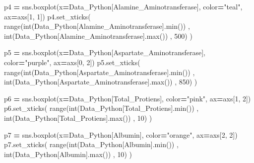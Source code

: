 \documentclass[
  11pt,
  a4paper,
]{article}
\newenvironment{Shaded}{\begin{snugshade}}{\end{snugshade}}
\newcommand{\BuiltInTok}[1]{#1}
\newcommand{\DecValTok}[1]{\textcolor[rgb]{0.00,0.00,0.81}{#1}}
\newcommand{\NormalTok}[1]{#1}
\newcommand{\OperatorTok}[1]{\textcolor[rgb]{0.81,0.36,0.00}{\textbf{#1}}}
\newcommand{\StringTok}[1]{\textcolor[rgb]{0.31,0.60,0.02}{#1}}
\begin{document}
\begin{Shaded}
\begin{Highlighting}[]
\NormalTok{p4 }\OperatorTok{=}\NormalTok{ sns.boxplot(x}\OperatorTok{=}\NormalTok{Data\_Python[}\StringTok{\textquotesingle{}Alamine\_Aminotransferase\textquotesingle{}}\NormalTok{], color}\OperatorTok{=}\StringTok{"teal"}\NormalTok{, ax}\OperatorTok{=}\NormalTok{axs[}\DecValTok{1}\NormalTok{, }\DecValTok{1}\NormalTok{])}
\NormalTok{p4.set\_xticks( }\BuiltInTok{range}\NormalTok{(}\BuiltInTok{int}\NormalTok{(Data\_Python[}\StringTok{\textquotesingle{}Alamine\_Aminotransferase\textquotesingle{}}\NormalTok{].}\BuiltInTok{min}\NormalTok{()) , }\BuiltInTok{int}\NormalTok{(Data\_Python[}\StringTok{\textquotesingle{}Alamine\_Aminotransferase\textquotesingle{}}\NormalTok{].}\BuiltInTok{max}\NormalTok{()) , }\DecValTok{500}\NormalTok{) )}

\NormalTok{p5 }\OperatorTok{=}\NormalTok{ sns.boxplot(x}\OperatorTok{=}\NormalTok{Data\_Python[}\StringTok{\textquotesingle{}Aspartate\_Aminotransferase\textquotesingle{}}\NormalTok{], color}\OperatorTok{=}\StringTok{"purple"}\NormalTok{, ax}\OperatorTok{=}\NormalTok{axs[}\DecValTok{0}\NormalTok{, }\DecValTok{2}\NormalTok{])}
\NormalTok{p5.set\_xticks( }\BuiltInTok{range}\NormalTok{(}\BuiltInTok{int}\NormalTok{(Data\_Python[}\StringTok{\textquotesingle{}Aspartate\_Aminotransferase\textquotesingle{}}\NormalTok{].}\BuiltInTok{min}\NormalTok{()) , }\BuiltInTok{int}\NormalTok{(Data\_Python[}\StringTok{\textquotesingle{}Aspartate\_Aminotransferase\textquotesingle{}}\NormalTok{].}\BuiltInTok{max}\NormalTok{()) , }\DecValTok{850}\NormalTok{) )}

\NormalTok{p6 }\OperatorTok{=}\NormalTok{ sns.boxplot(x}\OperatorTok{=}\NormalTok{Data\_Python[}\StringTok{\textquotesingle{}Total\_Protiens\textquotesingle{}}\NormalTok{], color}\OperatorTok{=}\StringTok{"pink"}\NormalTok{, ax}\OperatorTok{=}\NormalTok{axs[}\DecValTok{1}\NormalTok{, }\DecValTok{2}\NormalTok{])}
\NormalTok{p6.set\_xticks( }\BuiltInTok{range}\NormalTok{(}\BuiltInTok{int}\NormalTok{(Data\_Python[}\StringTok{\textquotesingle{}Total\_Protiens\textquotesingle{}}\NormalTok{].}\BuiltInTok{min}\NormalTok{()) , }\BuiltInTok{int}\NormalTok{(Data\_Python[}\StringTok{\textquotesingle{}Total\_Protiens\textquotesingle{}}\NormalTok{].}\BuiltInTok{max}\NormalTok{()) , }\DecValTok{10}\NormalTok{) )}

\NormalTok{p7 }\OperatorTok{=}\NormalTok{ sns.boxplot(x}\OperatorTok{=}\NormalTok{Data\_Python[}\StringTok{\textquotesingle{}Albumin\textquotesingle{}}\NormalTok{], color}\OperatorTok{=}\StringTok{"orange"}\NormalTok{, ax}\OperatorTok{=}\NormalTok{axs[}\DecValTok{2}\NormalTok{, }\DecValTok{2}\NormalTok{])}
\NormalTok{p7.set\_xticks( }\BuiltInTok{range}\NormalTok{(}\BuiltInTok{int}\NormalTok{(Data\_Python[}\StringTok{\textquotesingle{}Albumin\textquotesingle{}}\NormalTok{].}\BuiltInTok{min}\NormalTok{()) , }\BuiltInTok{int}\NormalTok{(Data\_Python[}\StringTok{\textquotesingle{}Albumin\textquotesingle{}}\NormalTok{].}\BuiltInTok{max}\NormalTok{()) , }\DecValTok{10}\NormalTok{) )}


\end{Highlighting}
\end{Shaded}
\end{document}
